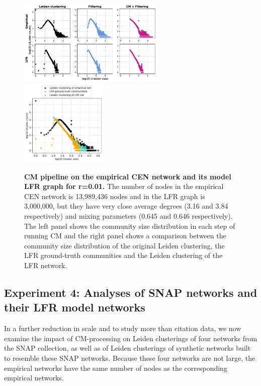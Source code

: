 \documentclass[11pt]{article}   	%
\begin{document}
\begin{figure}[h!]
\centering
\includegraphics[width=0.62\textwidth]{figs/cen_cm_steps_lfr01.pdf}
\includegraphics[width=0.37\textwidth]{figs/cen_01_cm_size.pdf}
\caption[CM pipeline on the empirical CEN network and its model LFR graph for r=0.01]{\textbf{CM pipeline on the empirical CEN network and its model LFR graph for r=0.01.} The number of nodes in the empirical CEN network is 13,989,436 nodes and in the LFR graph is 3,000,000, but they have very close average degrees (3.16 and 3.84 respectively) and mixing parameters (0.645 and 0.646 respectively). The left panel shows the community size distribution in each step of running CM and the right panel shows a comparison between the community size distribution of the original Leiden clustering, the LFR ground-truth communities and the Leiden clustering of the LFR network.}
\label{fig:cen-cm-lfr-01}
\end{figure}

\subsection{Experiment 4: Analyses of SNAP networks and their LFR model networks}

In a further reduction in scale and to study more than citation data, we now examine the impact of CM-processing on Leiden clusterings of four  networks from the SNAP collection, as well as of
Leiden clusterings of synthetic networks built to resemble these SNAP networks.
Because these four networks are not large, the empirical networks have the same number of nodes as the corresponding empirical networks.
\end{document}
